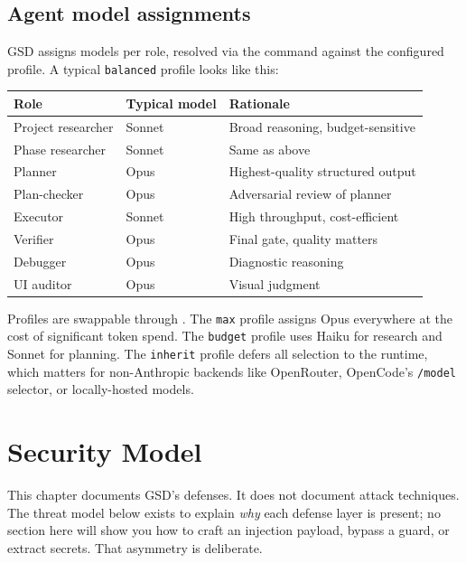 \documentclass[11pt,letterpaper,openany]{book}
\begin{document}
\section{Agent model assignments}

GSD assigns models per role, resolved via the  command against the configured profile. A typical \texttt{balanced} profile looks like this:

\begin{center}
\small
\begin{tabular}{lll}
\toprule
Role & Typical model & Rationale \\
\midrule
Project researcher & Sonnet & Broad reasoning, budget-sensitive \\
Phase researcher & Sonnet & Same as above \\
Planner & Opus & Highest-quality structured output \\
Plan-checker & Opus & Adversarial review of planner \\
Executor & Sonnet & High throughput, cost-efficient \\
Verifier & Opus & Final gate, quality matters \\
Debugger & Opus & Diagnostic reasoning \\
UI auditor & Opus & Visual judgment \\
\bottomrule
\end{tabular}
\end{center}

Profiles are swappable through . The \texttt{max} profile assigns Opus everywhere at the cost of significant token spend. The \texttt{budget} profile uses Haiku for research and Sonnet for planning. The \texttt{inherit} profile defers all selection to the runtime, which matters for non-Anthropic backends like OpenRouter, OpenCode's \texttt{/model} selector, or locally-hosted models.

\chapter{Security Model}

This chapter documents GSD's defenses. It does not document attack techniques. The threat model below exists to explain \textit{why} each defense layer is present; no section here will show you how to craft an injection payload, bypass a guard, or extract secrets. That asymmetry is deliberate.
\end{document}
